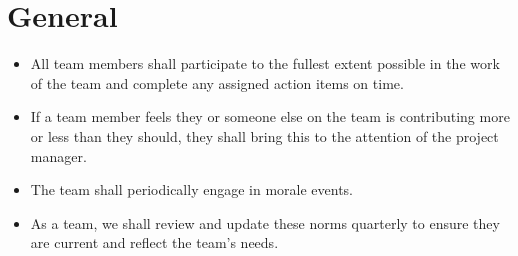 \section{General}

\begin{itemize}
    \item All team members shall participate to the fullest extent possible in the work of the team and complete any assigned action items on time.
    \item If a team member feels they or someone else on the team is contributing more or less than they should, they shall bring this to the attention of the project manager.
    \item The team shall periodically engage in morale events.
    \item As a team, we shall review and update these norms quarterly to ensure they are current and reflect the team's needs.
\end{itemize}
